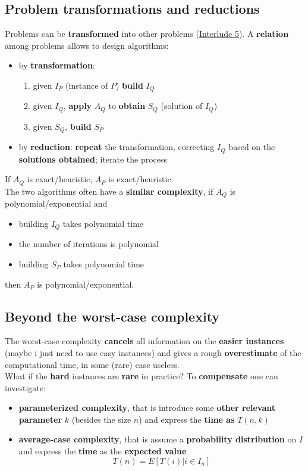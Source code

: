 \subsection{Problem transformations and reductions}
Problems can be \textbf{transformed} into other problems (\hyperref[I5]{Interlude 5}). A \textbf{relation} among problems allows to design algorithms: 
\begin{itemize}
	\item by \textbf{transformation}: 
	\begin{enumerate}
		\item given $I_P$ (instance of $P$) \textbf{build} $I_Q$
		\item given $I_Q$, \textbf{apply} $A_Q$ to \textbf{obtain} $S_Q$ (solution of $I_Q$)
		\item given $S_Q$, \textbf{build} $S_P$
	\end{enumerate}
	\item by \textbf{reduction}: \textbf{repeat} the transformation, correcting $I_Q$ based on the \textbf{solutions obtained}; iterate the process
\end{itemize}

If $A_Q$ is exact/heuristic, $A_P$ is exact/heuristic.\\

The two algorithms often have a \textbf{similar complexity}, if $A_Q$ is polynomial/exponential and
\begin{itemize}
	\item building $I_Q$ takes polynomial time
	\item the number of iterations is polynomial
	\item building $S_P$ takes polynomial time
\end{itemize}
then $A_P$ is polynomial/exponential.\\

\newpage

\subsection{Beyond the worst-case complexity}
The worst-case complexity \textbf{cancels} all information on the \textbf{easier instances} (maybe i just need to use easy instances) and gives a rough \textbf{overestimate} of the computational time, in some (rare) case useless.\\

What if the \textbf{hard} instances are \textbf{rare} in practice? To \textbf{compensate} one can investigate: 
\begin{itemize}
	\item \textbf{parameterized complexity}, that is introduce some \textbf{other relevant parameter} $k$ (besides the size $n$) and express the \textbf{time as} $T(n,k)$
	\item \textbf{average-case complexity}, that is assume a \textbf{probability distribution} on $I$ and express the \textbf{time} as the \textbf{expected value}
	$$ T(n) = E \left[T(i) | i \in I_n \right] $$
\end{itemize}

